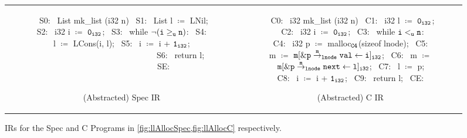 \begin{figure}[H]
\begin{tabular}{cc}
\begin{subfigure}[b]{0.4\textwidth}
\begin{center}
\begin{allLangEnvScript}
~{\scriptsize \textcolor{mygray}{S0:}}~ List mk_list (i32 n) {
~{\scriptsize \textcolor{mygray}{S1:}}~   List l $\coloneqq$ LNil;
~{\scriptsize \textcolor{mygray}{S2:}}~   i32  i $\coloneqq$ ${\tt 0_{i32}}$;
~{\scriptsize \textcolor{mygray}{S3:}}~   while $\mathrm{\tt \neg (i \geq_{u} n)}$:
~{\scriptsize \textcolor{mygray}{S4:}}~     l $\coloneqq$ LCons(i, l);
~{\scriptsize \textcolor{mygray}{S5:}}~     i $\coloneqq$ i + ${\tt 1_{i32}}$; $\phantom{m \coloneqq \mathrm{\tt m[\&\structPointer{\tt p}{m}{\tt lnode}{val} \leftarrow i]_{i32}};}$
~{\scriptsize \textcolor{mygray}{S6:}}~   return l; $\phantom{m \coloneqq \mathrm{\tt m[\&\structPointer{\tt p}{m}{\tt lnode}{next} \leftarrow l]_{i32}};}$
~{\scriptsize \textcolor{mygray}{SE:}}~ }
~{\scriptsize \textcolor{mygray}{   }}~
~{\scriptsize \textcolor{mygray}{   }}~
~{\scriptsize \textcolor{mygray}{   }}~
\end{allLangEnvScript}
\end{center}
\vspace{-15px}
\caption{\label{fig:llAllocSpecIR}(Abstracted) Spec IR}
\end{subfigure}%
&
\begin{subfigure}[b]{0.6\textwidth}
\begin{center}
\begin{allLangEnvScript}
~{\scriptsize \textcolor{mygray}{C0:}}~ i32 mk_list (i32 n) {
~{\scriptsize \textcolor{mygray}{C1:}}~   i32 l $\coloneqq$ ${\tt 0_{i32}}$;
~{\scriptsize \textcolor{mygray}{C2:}}~   i32 i $\coloneqq$ ${\tt 0_{i32}}$;
~{\scriptsize \textcolor{mygray}{C3:}}~   while ${\tt i <_{u} n}$:
~{\scriptsize \textcolor{mygray}{C4:}}~     i32 p $\coloneqq$ malloc$_{\tt C4}$(sizeof lnode);
~{\scriptsize \textcolor{mygray}{C5:}}~     m $\coloneqq$ $\mathrm{\tt m[\&{\tt \tt p} \overset{m}{\rightarrow}_{\tt lnode} {\tt val} \leftarrow i]_{i32}}$;
~{\scriptsize \textcolor{mygray}{C6:}}~     m $\coloneqq$ $\mathrm{\tt m[\&{\tt \tt p} \overset{m}{\rightarrow}_{\tt lnode} {\tt next} \leftarrow l]_{i32}}$;
~{\scriptsize \textcolor{mygray}{C7:}}~     l $\coloneqq$ p;
~{\scriptsize \textcolor{mygray}{C8:}}~     i $\coloneqq$ i + ${\tt 1_{i32}}$;
~{\scriptsize \textcolor{mygray}{C9:}}~   return l;
~{\scriptsize \textcolor{mygray}{CE:}}~ }
\end{allLangEnvScript}
\end{center}
\vspace{-15px}
\caption{\label{fig:llAllocCIR}(Abstracted) C IR}
\end{subfigure}%
\\
\end{tabular}
\caption{\label{fig:llAllocSpecIRAndCIR}IRs for the Spec and C Programs in \cref{fig:llAllocSpec,fig:llAllocC} respectively.}
\end{figure}
